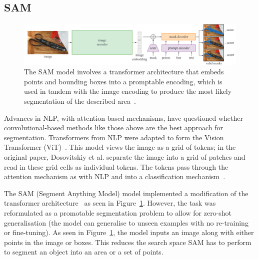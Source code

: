 \documentclass[12pt,twoside]{report}
\begin{document}




\subsection{SAM}\label{sect:sam}

\begin{figure}[H]
  \centering
  \includegraphics[width=1\linewidth]{../figures/SAM.png}
  \caption{The SAM model involves a transformer architecture that embeds points and bounding boxes into a promptable encoding, which is used in tandem with the image encoding to produce the most likely segmentation of the described area~\cite{SAM}.}\label{fig:sam}
\end{figure}

Advances in NLP, with attention-based mechanisms, have questioned whether convolutional-based methods like those above are the best approach for segmentation. Transformers from NLP were adapted to form the Vision Transformer (ViT)~\cite{ViT}. This model views the image as a grid of tokens; in the original paper, Dosovitskiy et al. separate the image into a grid of patches and read in these grid cells as individual tokens. The tokens pass through the attention mechanism as with NLP and into a classification mechanism~\cite{ViT}. 

The SAM (Segment Anything Model) model implemented a modification of the transformer architecture~\cite{SAM} as seen in Figure~\ref{fig:sam}. However, the task was reformulated as a promotable segmentation problem to allow for zero-shot generalisation (the model can generalise to unseen examples with no re-training or fine-tuning). As seen in Figure~\ref{fig:sam}, the model inputs an image along with either points in the image or boxes. This reduces the search space SAM has to perform to segment an object into an area or a set of points.
\end{document}
